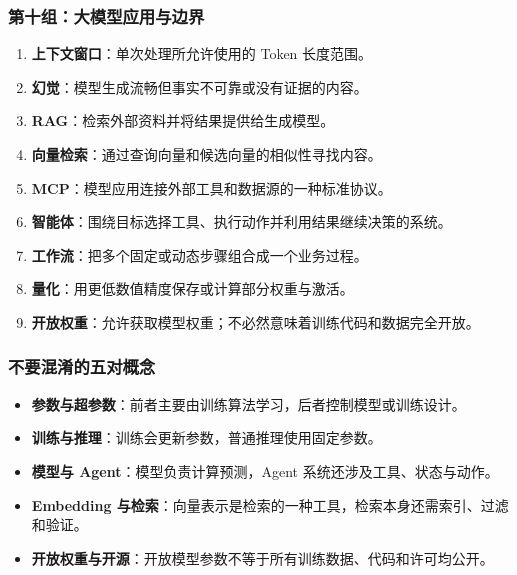 \subsubsection{第十组：大模型应用与边界}
\begin{enumerate}[leftmargin=2.5em,itemsep=4pt,start=92]
\item \textbf{上下文窗口}：单次处理所允许使用的 Token 长度范围。 
\item \textbf{幻觉}：模型生成流畅但事实不可靠或没有证据的内容。 
\item \textbf{RAG}：检索外部资料并将结果提供给生成模型。 
\item \textbf{向量检索}：通过查询向量和候选向量的相似性寻找内容。 
\item \textbf{MCP}：模型应用连接外部工具和数据源的一种标准协议。 
\item \textbf{智能体}：围绕目标选择工具、执行动作并利用结果继续决策的系统。 
\item \textbf{工作流}：把多个固定或动态步骤组合成一个业务过程。 
\item \textbf{量化}：用更低数值精度保存或计算部分权重与激活。 
\item \textbf{开放权重}：允许获取模型权重；不必然意味着训练代码和数据完全开放。 
\end{enumerate}

\subsubsection*{不要混淆的五对概念}
\begin{itemize}
\item \textbf{参数与超参数}：前者主要由训练算法学习，后者控制模型或训练设计。
\item \textbf{训练与推理}：训练会更新参数，普通推理使用固定参数。
\item \textbf{模型与 Agent}：模型负责计算预测，Agent 系统还涉及工具、状态与动作。
\item \textbf{Embedding 与检索}：向量表示是检索的一种工具，检索本身还需索引、过滤和验证。
\item \textbf{开放权重与开源}：开放模型参数不等于所有训练数据、代码和许可均公开。
\end{itemize}


